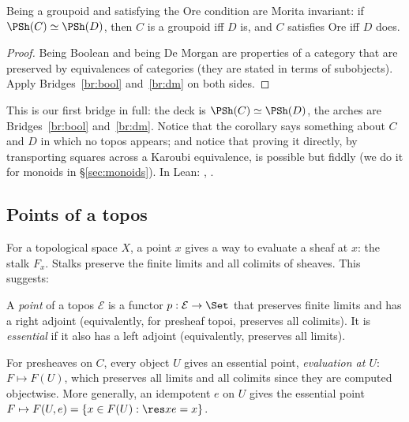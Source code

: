 
\begin{corollary}\label{cor:moritainv}
Being a groupoid and satisfying the Ore condition are Morita invariant: if $\PSh(C)\simeq\PSh(D)$, then $C$ is a groupoid iff $D$ is, and $C$ satisfies Ore iff $D$ does.
\end{corollary}

\begin{proof}
Being Boolean and being De Morgan are properties of a category that are preserved by equivalences of categories (they are stated in terms of subobjects). Apply Bridges~\ref{br:bool} and~\ref{br:dm} on both sides.
\end{proof}

This is our first bridge in full: the deck is $\PSh(C)\simeq\PSh(D)$, the arches are Bridges~\ref{br:bool} and~\ref{br:dm}. Notice that the corollary says something about $C$ and $D$ in which no topos appears; and notice that proving it directly, by transporting squares across a Karoubi equivalence, is possible but fiddly (we do it for monoids in \S\ref{sec:monoids}). In Lean: , .

\subsection{Points of a topos}

For a topological space $X$, a point $x$ gives a way to evaluate a sheaf at $x$: the stalk $F_x$. Stalks preserve the finite limits and all colimits of sheaves. This suggests:

\begin{definition}
A \emph{point} of a topos $\mathcal E$ is a functor $p : \mathcal E\to\Set$ that preserves finite limits and has a right adjoint (equivalently, for presheaf topoi, preserves all colimits). It is \emph{essential} if it also has a left adjoint (equivalently, preserves all limits).
\end{definition}

For presheaves on $C$, every object $U$ gives an essential point, \emph{evaluation at $U$}: $F\mapsto F(U)$, which preserves all limits and all colimits since they are computed objectwise. More generally, an idempotent $e$ on $U$ gives the essential point $F\mapsto F(U,e) = \{x\in F(U):\res xe = x\}$.

